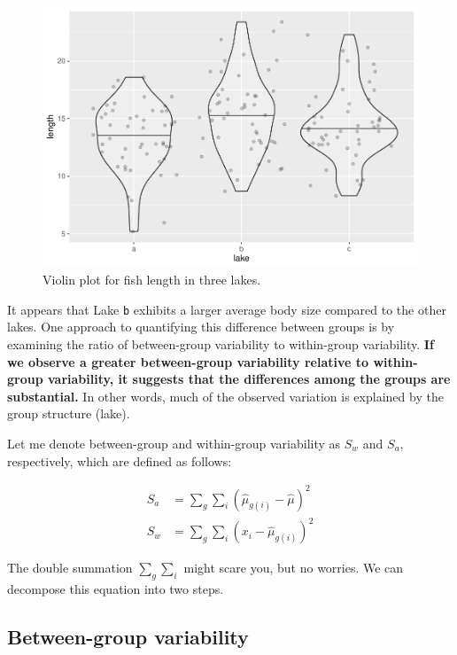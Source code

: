 \documentclass[
]{book}
\begin{document}
\begin{figure}

{\centering \includegraphics{_main_files/figure-latex/violin-1} 

}

\caption{Violin plot for fish length in three lakes.}\label{fig:violin}
\end{figure}

It appears that Lake \texttt{b} exhibits a larger average body size compared to the other lakes. One approach to quantifying this difference between groups is by examining the ratio of between-group variability to within-group variability. \textbf{If we observe a greater between-group variability relative to within-group variability, it suggests that the differences among the groups are substantial.} In other words, much of the observed variation is explained by the group structure (lake).

Let me denote between-group and within-group variability as \(S_w\) and \(S_a\), respectively, which are defined as follows:

\[
\begin{aligned}
S_a &= \sum_g \sum_i (\hat{\mu}_{g(i)} - \hat{\mu})^2\\
S_w &= \sum_g \sum_i (x_{i} - \hat{\mu}_{g(i)})^2
\end{aligned}
\]

The double summation \(\sum_g \sum_i\) might scare you, but no worries. We can decompose this equation into two steps.

\hypertarget{between-group-variability}{%
\subsection{Between-group variability}\label{between-group-variability}}
\end{document}
